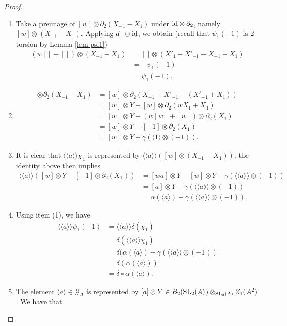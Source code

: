 \documentclass[11pt]{amsart}
\theoremstyle{definition}
\theoremstyle{plain}
\theoremstyle{definition}
\numberwithin{equation}{section}
\newcommand{\GG}{\mathcal{G}}
\newcommand{\lan}{\langle}
\newcommand{\ran}{\rangle}
\newcommand{\Lan}{\langle \! \langle}
\newcommand{\Ran}{\rangle \! \rangle}
\newcommand{\SL}{\mathit{{\rm SL}}}
\newcommand{\id}{{\rm id}}
\begin{document}
	\begin{proof}
		\begin{enumerate}
			\item Take a preimage of $[w]\otimes \partial_2(X_{-1}-X_1)$ under $\id\otimes\partial_2$, namely $[w]\otimes(X_{-1}-X_1)$. Applying $d_1\otimes\id$, we obtain (recall that $\psi_1(-1)$ is $2$-torsion by Lemma \ref{lem-psi1})
			\begin{align*}
				(w[]-[])\otimes(X_{-1}-X_1)&=[]\otimes(X'_1-X'_{-1}-X_{-1}+X_1)\\
				&=-\psi_1(-1)\\
				&=\psi_1(-1).
			\end{align*}
			\item 
			\begin{align*}
				[w]\otimes\partial_2(X_{-1}-X_1)&=[w]\otimes\partial_2(X_{-1}+X'_{-1}-(X'_{-1}+X_1))\\
				&=[w]\otimes Y-[w]\otimes\partial_2(wX_1+X_1)\\
				&=[w]\otimes Y-(w[w]+[w])\otimes\partial_2(X_1)\\
				&=[w]\otimes Y-[-1]\otimes\partial_2(X_1)\\
				&=[w]\otimes Y-\gamma(\lan 1\ran\otimes(-1)).
			\end{align*}
			\item It is clear that $\Lan a\Ran\chi_1$ is represented by $\Lan a\Ran([w]\otimes(X_{-1}-X_1))$; the identity above then implies
			\begin{align*}
				\Lan a\Ran([w]\otimes Y-[-1]\otimes\partial_2(X_1))&=[wa]\otimes Y - [w]\otimes Y-\gamma(\Lan a\Ran\otimes (-1))\\
				&=[a]\otimes Y-\gamma(\Lan a\Ran\otimes (-1))\\
				&=\alpha(\lan a\ran)-\gamma(\Lan a\Ran\otimes (-1)).
			\end{align*}
			\item Using item (1), we have
			\begin{align*}
				\Lan a\Ran\psi_1(-1)&=\Lan a\Ran\delta(\chi_1)\\
				&=\delta(\Lan a\Ran\chi_1)\\
				&=\delta(\alpha(\lan a\ran)-\gamma(\Lan a\Ran\otimes(-1))\\
				&=\delta(\alpha(\lan a\ran))\\
				&=\delta\circ\alpha(\lan a\ran).
			\end{align*}
			\item The element $\lan a\ran\in\GG_A$ is represented by $[a]\otimes Y\in B_2(\SL_2(A))\otimes_{\SL_2(A)}Z_1(A^2)$. We have that

\end{enumerate}
\end{proof}
\end{document}
